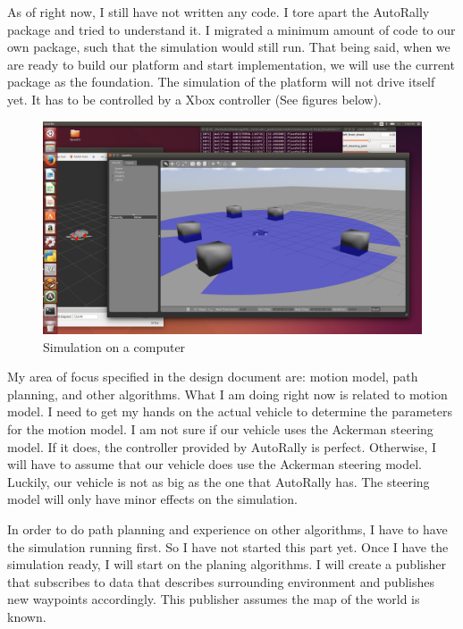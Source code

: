 \documentclass[compsoc,draftclsnofoot,onecolumn,10pt]{IEEEtran}
\begin{document}
As of right now, I still have not written any code. I tore apart the AutoRally package and tried to understand it. I migrated a minimum amount of code to our own package, such that the simulation would still run. That being said, when we are ready to build our platform and start implementation, we will use the current package as the foundation. The simulation of the platform will not drive itself yet. It has to be controlled by a Xbox controller (See figures below). \par 

\begin{figure}[H]
  \centering
  \includegraphics[width=\textwidth]{arc_prog_report_Tao_3}
  \caption{Simulation on a computer}
\end{figure}

My area of focus specified in the design document are: motion model, path planning, and other algorithms. What I am doing right now is related to motion model. I need to get my hands on the actual vehicle to determine the parameters for the motion model. I am not sure if our vehicle uses the Ackerman steering model. If it does, the controller provided by AutoRally is perfect. Otherwise, I will have to assume that our vehicle does use the Ackerman steering model. Luckily, our vehicle is not as big as the one that AutoRally has. The steering model will only have minor effects on the simulation. 

In order to do path planning and experience on other algorithms, I have to have the simulation running first. So I have not started this part yet. Once I have the simulation ready, I will start on the planing algorithms. I will create a publisher that subscribes to data that describes surrounding environment and publishes new waypoints accordingly. This publisher assumes the map of the world is known.
\end{document}
